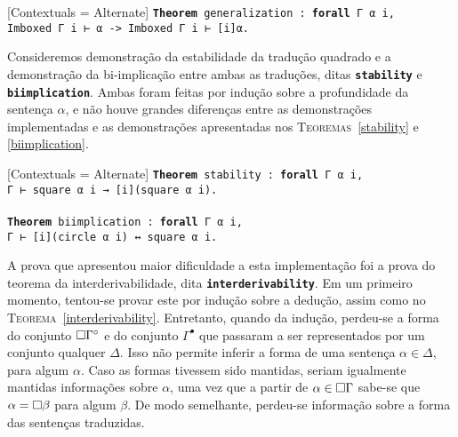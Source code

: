 \vspace{0.5\baselineskip}
\begin{tcolorbox}[enhanced jigsaw, breakable, sharp corners, colframe=black, colback=white, boxrule=0.5pt, left=1.5mm, right=1.5mm, top=1.5mm, bottom=1.5mm]
\setmonofont{Fira Code}[Contextuals = Alternate]
\texttt{\noindent\footnotesize\textbf{Theorem} generalization : \textbf{forall} Γ α i,\\Imboxed Γ i ⊢ α -> Imboxed Γ i ⊢ [i]α.}
\end{tcolorbox}

\vspace{0.5\baselineskip}
Consideremos demonstração da estabilidade da tradução quadrado e a demonstração da bi-implicação entre ambas as traduções, ditas \texttt{\textbf{stability}} e \texttt{\textbf{biimplication}}.
Ambas foram feitas por indução sobre a profundidade da sentença $\alpha$, e não houve grandes diferenças entre as demonstrações implementadas e as demonstrações apresentadas nos \textsc{Teoremas}~\ref{stability} e \ref{biimplication}.

\vspace{0.5\baselineskip}
\begin{tcolorbox}[enhanced jigsaw, breakable, sharp corners, colframe=black, colback=white, boxrule=0.5pt, left=1.5mm, right=1.5mm, top=1.5mm, bottom=1.5mm]
\setmonofont{Fira Code}[Contextuals = Alternate]
\texttt{\noindent\footnotesize\textbf{Theorem} stability : \textbf{forall} Γ α i,\\Γ ⊢ square α i → [i](square α i).\\
\\
\textbf{Theorem} biimplication : \textbf{forall} Γ α i,\\Γ ⊢ [i](circle α i) ↔ square α i.
}
\end{tcolorbox}

\vspace{.5\baselineskip}
A prova que apresentou maior dificuldade a esta implementação foi a prova do teorema da interderivabilidade, dita \texttt{\textbf{interderivability}}.
Em um primeiro momento, tentou-se provar este por indução sobre a dedução, assim como no \textsc{Teorema}~\ref{interderivability}.
Entretanto, quando da indução, perdeu-se a forma do conjunto $\Box\Gamma^\circ$ e do conjunto $\Gamma^\bullet$ que passaram a ser representados por um conjunto qualquer $\Delta$.
Isso não permite inferir a forma de uma sentença $\alpha\in\Delta$, para algum $\alpha$.
Caso as formas tivessem sido mantidas, seriam igualmente mantidas informações sobre $\alpha$, uma vez que a partir de $\alpha\in\Box\Gamma$ sabe-se que $\alpha=\Box\beta$ para algum $\beta$.
De modo semelhante, perdeu-se informação sobre a forma das sentenças traduzidas.

